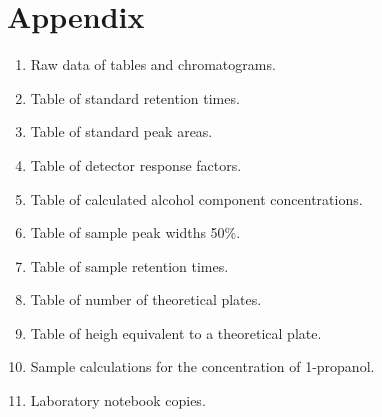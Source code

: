 \documentclass{article}
\begin{document}
\section*{Appendix}
\begin{enumerate}
    \item Raw data of tables and chromatograms.
    \item Table of standard retention times.
    \item Table of standard peak areas.
    \item Table of detector response factors.
    \item Table of calculated alcohol component concentrations.
    \item Table of sample peak widths 50\%.
    \item Table of sample retention times.
    \item Table of number of theoretical plates.
    \item Table of heigh equivalent to a theoretical plate.
    \item Sample calculations for the concentration of 1-propanol.
    \item Laboratory notebook copies.
\end{enumerate}
\newpage
\end{document}
